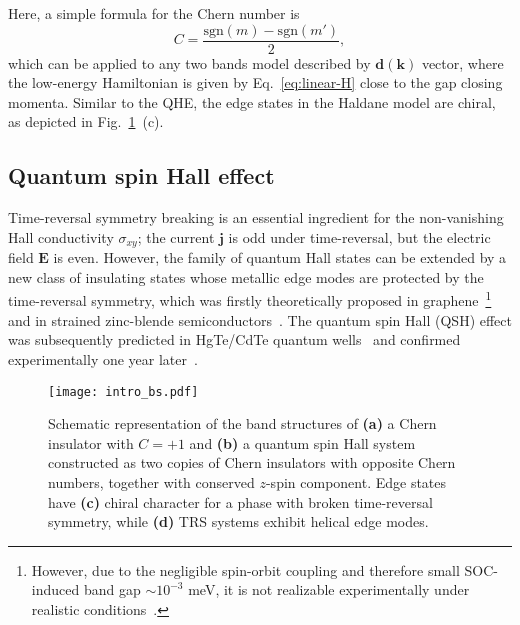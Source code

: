 Here, a simple formula for the Chern number is
\begin{equation}
C = \frac{\mathrm{sgn} (m) - \mathrm{sgn} (m') }{2},
\end{equation}
which can be applied to any two bands model described by $\mathbf{d} ( \mathbf{k})$ vector, where the low-energy Hamiltonian is given by Eq.~\eqref{eq:linear-H} close to the gap closing momenta. Similar to the QHE, the edge states in the Haldane model are chiral, as depicted in Fig.~\ref{fig:qheqshe}~(c).

\subsection{Quantum spin Hall effect}
\label{sec:qshe}
Time-reversal symmetry breaking is an essential ingredient for the non-vanishing Hall conductivity $\sigma_{xy}$; the current $\mathbf{j}$ is odd under time-reversal, but the electric field $\mathbf{E}$ is even. However, the family of quantum Hall states can be extended by a new class of insulating states whose metallic edge modes are protected by the time-reversal symmetry, which was firstly theoretically proposed in graphene~\cite{KaneMeleGraphene,PhysRevLett.95.146802}\footnote{However, due to the negligible spin-orbit coupling and therefore small SOC-induced band gap $\sim 10^{-3}$ meV, it is not realizable experimentally under realistic conditions~\cite{PhysRevB.74.165310, PhysRevB.75.041401}.} and in strained zinc-blende semiconductors~\cite{BernevigQSHE2006}. The quantum spin Hall (QSH) effect was subsequently predicted in HgTe/CdTe quantum wells~\cite{Bernevig1757} and confirmed experimentally one year later~\cite{MolenkampQSHE2007}. 

\begin{figure}[H]
\centering
\texttt{[image: intro\_bs.pdf]}
\caption[Comparison between a Chern insulator and a QSH system]{Schematic representation of the band structures of \textbf{(a)} a Chern insulator with $C = +1$ and \textbf{(b)} a quantum spin Hall system constructed as two copies of Chern insulators with opposite Chern numbers, together with conserved $z$-spin component. Edge states have \textbf{(c)} chiral character for a phase with broken time-reversal symmetry, while \textbf{(d)} TRS systems exhibit helical edge modes.}
\label{fig:qheqshe}
\end{figure}

